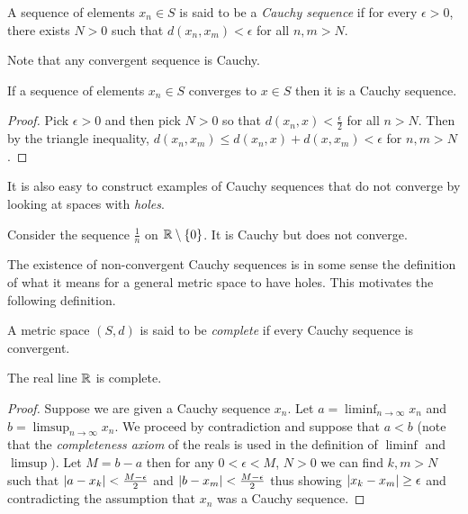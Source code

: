 \begin{defn}A sequence of elements $x_n \in S$ is said to be a
  \emph{Cauchy sequence}
  if for every $\epsilon > 0$, there exists $N > 0$ such that
  $d(x_n,x_m) < \epsilon$ for all $n,m > N$.
\end{defn}
Note that any convergent sequence is Cauchy.
\begin{lem}If a sequence of elements $x_n \in S$ converges to $x \in
  S$ then it is a Cauchy sequence.
\end{lem}
\begin{proof}Pick $\epsilon > 0$ and then pick $N>0$ so that $d(x_n,x)
  < \frac{\epsilon}{2}$ for all $n > N$.  Then by the triangle
  inequality, $d(x_n, x_m) \leq d(x_n, x) + d(x, x_m) < \epsilon$ for
  $n,m > N$.
\end{proof}
It is also easy to construct examples of Cauchy sequences that do not
converge by looking at spaces with \emph{holes}.
\begin{examp}Consider the sequence $\frac{1}{n}$ on $\mathbb{R} \setminus
  \lbrace 0 \rbrace$.  It is Cauchy but does not converge.
\end{examp}
The existence of non-convergent Cauchy sequences is in some sense the
definition of what it means for a general metric space to have holes.
This motivates the following definition.
\begin{defn}A metric space $(S,d)$ is said to be \emph{complete} if
  every Cauchy sequence is convergent.
\end{defn}
\begin{defn}The real line $\mathbb{R}$ is complete.
\end{defn}
\begin{proof}Suppose we are given a Cauchy sequence $x_n$.  Let $a =
  \liminf_{n \to \infty} x_n$ and $b = \limsup_{n \to \infty} x_n $.
  We proceed by contradiction and suppose
  that $a < b$ (note
  that the \emph{completeness axiom} of the reals is used in the
  definition of $\liminf$ and $\limsup$).  Let $M =b-a$ then for any
  $0 < \epsilon < M$, $N>0$
  we can find $k,m > N$ such that $\left \vert a - x_k \right \vert < \frac{M -
    \epsilon}{2}$ and $\left \vert b - x_m \right \vert < \frac{M -
    \epsilon}{2}$ thus showing $\left \vert x_k - x_m \right \vert \geq \epsilon$ and
  contradicting the assumption that $x_n$ was a Cauchy sequence.
\end{proof}

